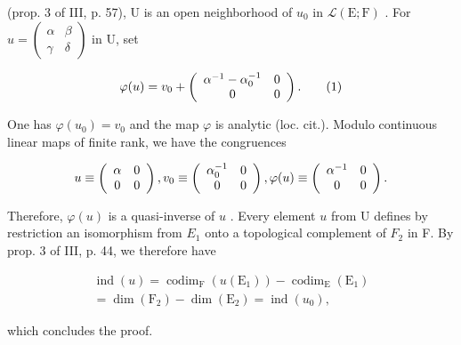 (prop. 3 of III, p. 57), U is an open neighborhood of \(u_0\) in \(\mathcal{L}(\mathrm{E};\mathrm{F})\) . For \(u = \begin{pmatrix} \alpha & \beta \\ \gamma & \delta \end{pmatrix}\) in U, set

\[
\varphi (u) = v _ {0} + \left( \begin{array}{c c} \alpha^ {- 1} - \alpha_ {0} ^ {- 1} & 0 \\ 0 & 0 \end{array} \right).\tag{1}
\]

One has \(\varphi(u_{0}) = v_{0}\) and the map \(\varphi\) is analytic (loc. cit.). Modulo continuous linear maps of finite rank, we have the congruences

\[
u \equiv \left( \begin{array}{c c} \alpha & 0 \\ 0 & 0 \end{array} \right) , v _ {0} \equiv \left( \begin{array}{c c} \alpha_ {0} ^ {- 1} & 0 \\ 0 & 0 \end{array} \right) , \varphi (u) \equiv \left( \begin{array}{c c} \alpha^ {- 1} & 0 \\ 0 & 0 \end{array} \right).
\]

Therefore, \(\varphi(u)\) is a quasi-inverse of \(u\) . Every element \(u\) from U defines by restriction an isomorphism from \(E _1\) onto a topological complement of \(F _2\) in F. By prop. 3 of III, p. 44, we therefore have

\[
\begin{array}{c} \operatorname{ind} (u) = \operatorname{codim} _ {\mathrm{F}} (u (\mathrm{E} _ {1})) - \operatorname{codim} _ {\mathrm{E}} (\mathrm{E} _ {1}) \\ = \dim (\mathrm{F} _ {2}) - \dim (\mathrm{E} _ {2}) = \operatorname{ind} (u _ {0}), \end{array}
\]

which concludes the proof.
\relax{}
